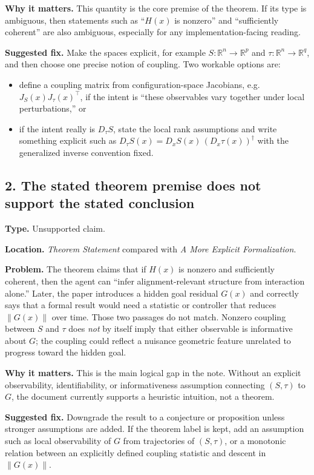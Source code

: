 \documentclass[11pt]{article}
\begin{document}
\textbf{Why it matters.} This quantity is the core premise of the theorem. If its type is ambiguous, then statements such as ``$H(x)$ is nonzero'' and ``sufficiently coherent'' are also ambiguous, especially for any implementation-facing reading.

\textbf{Suggested fix.} Make the spaces explicit, for example $S:\mathbb{R}^n \to \mathbb{R}^p$ and $\tau:\mathbb{R}^n \to \mathbb{R}^q$, and then choose one precise notion of coupling. Two workable options are:
\begin{itemize}
    \item define a coupling matrix from configuration-space Jacobians, e.g. $J_S(x)J_\tau(x)^\top$, if the intent is ``these observables vary together under local perturbations,'' or
    \item if the intent really is $D_\tau S$, state the local rank assumptions and write something explicit such as $D_\tau S(x)=D_xS(x)\,(D_x\tau(x))^{\dagger}$ with the generalized inverse convention fixed.
\end{itemize}

\subsection*{2. The stated theorem premise does not support the stated conclusion}

\textbf{Type.} Unsupported claim.

\textbf{Location.} \emph{Theorem Statement} compared with \emph{A More Explicit Formalization}.

\textbf{Problem.} The theorem claims that if $H(x)$ is nonzero and sufficiently coherent, then the agent can ``infer alignment-relevant structure from interaction alone.'' Later, the paper introduces a hidden goal residual $G(x)$ and correctly says that a formal result would need a statistic or controller that reduces $\lVert G(x) \rVert$ over time. Those two passages do not match. Nonzero coupling between $S$ and $\tau$ does \emph{not} by itself imply that either observable is informative about $G$; the coupling could reflect a nuisance geometric feature unrelated to progress toward the hidden goal.

\textbf{Why it matters.} This is the main logical gap in the note. Without an explicit observability, identifiability, or informativeness assumption connecting $(S,\tau)$ to $G$, the document currently supports a heuristic intuition, not a theorem.

\textbf{Suggested fix.} Downgrade the result to a conjecture or proposition unless stronger assumptions are added. If the theorem label is kept, add an assumption such as local observability of $G$ from trajectories of $(S,\tau)$, or a monotonic relation between an explicitly defined coupling statistic and descent in $\lVert G(x) \rVert$.
\end{document}
